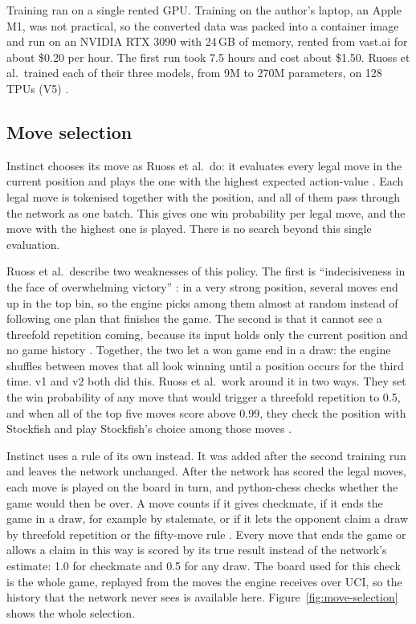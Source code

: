 Training ran on a single rented \ac{GPU}.
Training on the author's laptop, an Apple M1, was not practical, so the converted data was packed into a container image and run on an NVIDIA RTX 3090 with 24\,GB of memory, rented from vast.ai for about \$0.20 per hour.
The first run took 7.5 hours and cost about \$1.50.
Ruoss et al.\ trained each of their three models, from 9M to 270M parameters, on 128 \acp{TPU} (V5) \cite{Ruoss2024}.

\subsection{Move selection}
\label{subsec:move-selection}

Instinct chooses its move as Ruoss et al.\ do: it evaluates every legal move in the current position and plays the one with the highest expected action-value \cite{Ruoss2024}.
Each legal move is tokenised together with the position, and all of them pass through the network as one batch.
This gives one win probability per legal move, and the move with the highest one is played.
There is no search beyond this single evaluation.

Ruoss et al.\ describe two weaknesses of this policy.
The first is ``indecisiveness in the face of overwhelming victory'' \cite{Ruoss2024}: in a very strong position, several moves end up in the top bin, so the engine picks among them almost at random instead of following one plan that finishes the game.
The second is that it cannot see a threefold repetition coming, because its input holds only the current position and no game history \cite{Ruoss2024}.
Together, the two let a won game end in a draw: the engine shuffles between moves that all look winning until a position occurs for the third time.
v1 and v2 both did this.
Ruoss et al.\ work around it in two ways.
They set the win probability of any move that would trigger a threefold repetition to 0.5, and when all of the top five moves score above 0.99, they check the position with Stockfish and play Stockfish's choice among those moves \cite{Ruoss2024}.

Instinct uses a rule of its own instead.
It was added after the second training run and leaves the network unchanged.
After the network has scored the legal moves, each move is played on the board in turn, and python-chess checks whether the game would then be over.
A move counts if it gives checkmate, if it ends the game in a draw, for example by stalemate, or if it lets the opponent claim a draw by threefold repetition or the fifty-move rule \cite{pythonchess}.
Every move that ends the game or allows a claim in this way is scored by its true result instead of the network's estimate: 1.0 for checkmate and 0.5 for any draw.
The board used for this check is the whole game, replayed from the moves the engine receives over \ac{UCI}, so the history that the network never sees is available here.
Figure~\ref{fig:move-selection} shows the whole selection.

